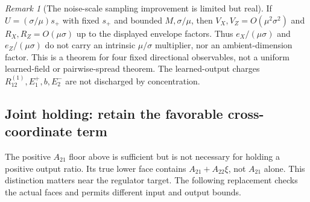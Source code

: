 \documentclass{article} %
\theoremstyle{plain}
\theoremstyle{definition}
\theoremstyle{remark}
\newtheorem{remark}[theorem]{Remark}
\begin{document}
\begin{remark}[The noise-scale sampling improvement is limited but real]
If $U=(\sigma/\mu)s_+$ with fixed $s_+$ and bounded $M,\sigma/\mu$, then
$V_X,V_Z=O(\mu^2\sigma^2)$ and
$R_X,R_Z=O(\mu\sigma)$ up to the displayed envelope factors.
Thus $e_X/(\mu\sigma)$ and $e_Z/(\mu\sigma)$ do not carry an intrinsic
$\mu/\sigma$ multiplier, nor an ambient-dimension factor.
This is a theorem for four fixed directional observables, not a uniform
learned-field or pairwise-spread theorem. The learned-output charges
$R_{12}^{(1)},E_1^+,b,E_2^-$ are not discharged by concentration.
\end{remark}

\subsection{Joint holding: retain the favorable cross-coordinate term}

The positive $A_{21}$ floor above is sufficient but is not necessary for
holding a positive output ratio. Its true lower face contains
$A_{21}+A_{22}\xi$, not $A_{21}$ alone. This distinction matters near
the regulator target. The following replacement checks the actual faces
and permits different input and output bounds.
\end{document}
